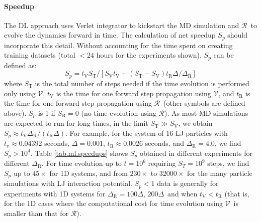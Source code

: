 \documentclass[aps,prl,twocolumn,superscriptaddress,tightenlines,longbibliography, reprint]{revtex4-1}
\newcommand{\dt}{$\Delta$}
\newcommand{\dtR}{$\Delta_{\textrm{R}}$}
\newcommand{\R}{$\mathscr{R}$}
\newcommand{\V}{$\mathscr{V}$}
\newcommand{\SR}{$S_{\mathrm{R}}$}
\begin{document}
\paragraph{Speedup}

The DL approach uses Verlet integrator to kickstart the MD simulation and \R\ to evolve the dynamics forward in time. The calculation of net speedup $S_p$ should incorporate this detail. Without accounting for the time spent on creating training datasets (total $<24$ hours for the experiments shown), $S_p$ can be defined as:
\begin{equation}\label{eq:speedup}
    S_p = t_{\mathrm{V}}S_{\mathrm{T}}/
    \left[S_{\mathrm{V}} t_{\mathrm{V}} + \left(S_{\mathrm{T}} - S_{\mathrm{V}}\right) t_{\mathrm{R}} \Delta / \Delta_{\mathrm{R}}\right]
\end{equation}
where $S_{\mathrm{T}}$ is the total number of steps needed if the time evolution is performed only using \V, $t_{\mathrm{V}}$ is the time for one forward step propagation using \V, and
$t_{\mathrm{R}}$ is the time for one forward step propagation using \R\ (other symbols are defined above).
$S_p$ is 1 if \SR$=0$ (no time evolution using \R). As most MD simulations are expected to run for long times, in the limit $S_{\mathrm{T}} \gg S_{\mathrm{V}}$, we obtain $S_p \approx t_{\mathrm{V}}\Delta_{\mathrm{R}} / (t_{\mathrm{R}}\Delta)$.
For example, for the system of 16 LJ particles with  $t_{\mathrm{v}}\approx 0.04392$ seconds, $\Delta =0.001$, $t_{\mathrm{R}} \approx 0.0026$ seconds, and $\Delta_{\mathrm{R}}=4.0$, we find $S_p > 10^4$. Table \ref{tab.ml.speedups} shows $S_p$ obtained in different experiments for different \dtR.  
For time evolution up to $t=10^6$ requiring $S_T=10^9$ steps, we find $S_p$ up to $45\times$ for 1D systems, and from $230\times$ to $32000\times$ for the many particle simulations with LJ interaction potential.
$S_p < 1$ data is generally for experiments with 1D systems for $\Delta_{\mathrm{R}} = 100$\dt, $200$\dt\ and when $t_{\mathrm{V}} < t_{\mathrm{R}}$ (that is, for the 1D cases where the computational cost for time evolution using \V\ is smaller than that for \R).
\end{document}
